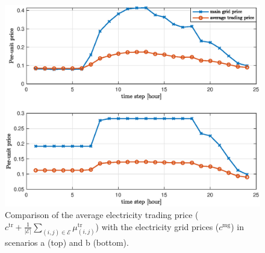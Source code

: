 \documentclass{IEEEtran}  %
\newcommand{\mc}{\mathcal}
\newcommand{\0}{\mathbf{0}}
\newcommand{\1}{\mathbf{1}}
\newcommand{\note}[1]{\textcolor{blue}{\texttt{#1}}}
\begin{document}
\begin{figure}[t]
	\centering 
	\marginnote{\note{R3-5}}
	\includegraphics[width=1\linewidth]{figures/simB_0402_pt3_v1}
	\caption{Comparison of the average electricity trading price ($c^{\mathrm{tr}} + \tfrac{1}{|\mc E|}\sum_{(i,j)\in \mc E}\mu_{(i,j)}^{\mathrm{tr}}$) with the electricity grid prices ($c^{\mathrm{mg}}$) in scenarios a (top) and b (bottom).
	}
	\label{fig:sim_B3}
\end{figure}  

\end{document}
